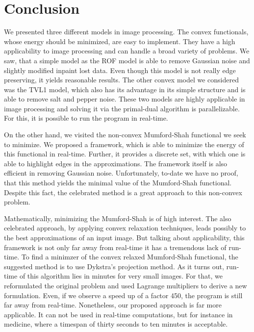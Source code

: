 \documentclass{scrreprt}
\begin{document}

\chapter{Conclusion} %
\label{cha:conclusion}
	
    We presented three different models in image processing. The convex functionals, whose energy should be minimized, are easy to implement. They have a high applicability to image processing and can handle a broad variety of problems. We saw, that a simple model as the ROF model is able to remove Gaussian noise and slightly modified inpaint lost data. Even though this model is not really edge preserving, it yields reasonable results. The other convex model we considered was the TVL1 model, which also has its advantage in its simple structure and is able to remove salt and pepper noise. These two models are highly applicable in image processing and solving it via the primal-dual algorithm is parallelizable. For this, it is possible to run the program in real-time.

    On the other hand, we visited the non-convex Mumford-Shah functional we seek to minimize. We proposed a framework, which is able to minimize the energy of this functional in real-time. Further, it provides a discrete set, with which one is able to highlight edges in the approximations. The framework itself is also efficient in removing Gaussian noise. Unfortunately, to-date we have no proof, that this method yields the minimal value of the Mumford-Shah functional. Despite this fact, the celebrated method is a great approach to this non-convex problem.

    Mathematically, minimizing the Mumford-Shah is of high interest. The also celebrated approach, by applying convex relaxation techniques, leads possibly to the best approximations of an input image. But talking about applicability, this framework is not only far away from real-time it has a tremendous lack of run-time. To find a minimzer of the convex relaxed Mumford-Shah functional, the suggested method is to use Dykstra's projection method. As it turns out, run-time of this algorithm lies in minutes for very small images. For that, we reformulated the original problem and used Lagrange multipliers to derive a new formulation. Even, if we observe a speed up of a factor 450, the program is still far away from real-time. Nonetheless, our proposed approach is far more applicable. It can not be used in real-time computations, but for instance in medicine, where a timespan of thirty seconds to ten minutes is acceptable.
\end{document}
